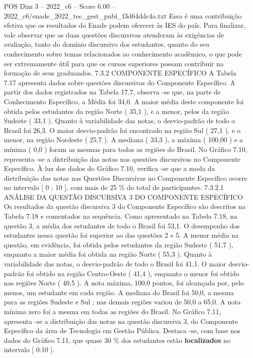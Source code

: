 \begin{textsample}{POS Dim 3 – 2022\_c6 – Score 6.00 – 2022\_c6/enade\_2022\_tec\_gest\_publ\_f3d64ddc4a.txt}
Essa é uma contribuição efetiva que os resultados do Enade podem oferecer às IES do país.
Para finalizar, vale observar que as duas questões discursivas atenderam às exigências de avaliação, tanto do domínio discursivo dos estudantes, quanto do seu conhecimento sobre temas relacionados ao conhecimento acadêmico, o que pode ser extremamente útil para que os cursos superiores possam contribuir na formação de seus graduandos. 7.3.2 COMPONENTE ESPECÍFICO A Tabela 7.17 apresenta dados sobre questões discursivas do Componente Específico.
A partir dos dados registrados na Tabela 17.7, observa -se que, na parte de Conhecimento Específico, a Média foi 34,0.
A maior média deste componente foi obtida pelos estudantes da região Norte ( 35,1 ), e a menor, pelos da região Sudeste ( 33,1 ).
Quanto à variabilidade das notas, o desvio-padrão de todo o Brasil foi 26,3.
O maior desvio-padrão foi encontrado na região Sul ( 27,1 ), e o menor, na região Nordeste ( 25,7 ).
A mediana ( 33,3 ), a máxima ( 100,00 ) e a mínima ( 0,0 ) foram as mesmas para todas as regiões do Brasil.
No Gráfico 7.10, representa -se a distribuição das notas nas questões discursivas no Componente Específico.
À luz dos dados do Gráfico 7.10, verifica -se que a moda da distribuição das notas nas Questões Discursivas no Componente Específico ocorre no intervalo [ 0 ; 10 ], com mais de 25 \% do total de participantes. 7.3.2.1 ANÁLISE DA QUESTÃO DISCURSIVA 3 DO COMPONENTE ESPECÍFICO Os resultados da questão discursiva 3 do Componente Específico são descritos na Tabela 7.18 e comentados na sequência.
Como apresentado na Tabela 7.18, na questão 3, a média dos estudantes de todo o Brasil foi 53,1.
O desempenho dos estudantes nessa questão foi superior ao das questões 2 e 5.
A menor média na questão, em evidência, foi obtida pelos estudantes da região Sudeste ( 51,7 ), enquanto a maior média foi obtida na região Norte ( 55,3 ).
Quanto à variabilidade das notas, o desvio-padrão de todo o Brasil foi 41,1.
O maior desvio-padrão foi obtido na região Centro-Oeste ( 41,4 ), enquanto o menor foi obtido nas regiões Norte ( 40,5 ).
A nota máxima, 100,0 pontos, foi alcançada por, pelo menos, um estudante em cada região.
A mediana do Brasil foi 50,0, a mesma para as regiões Sudeste e Sul ; nas demais regiões variou de 50,0 a 65,0.
A nota mínima zero foi a mesma em todas as regiões do Brasil.
No Gráfico 7.11, apresenta -se a distribuição das notas na questão discursiva 3, do Componente Específico da área de Tecnologia em Gestão Pública.
Destaca -se, com base nos dados do Gráfico 7.11, que quase 30 \% dos estudantes estão \textbf{localizados} no intervalo [ 0:10 ].

\end{textsample}
